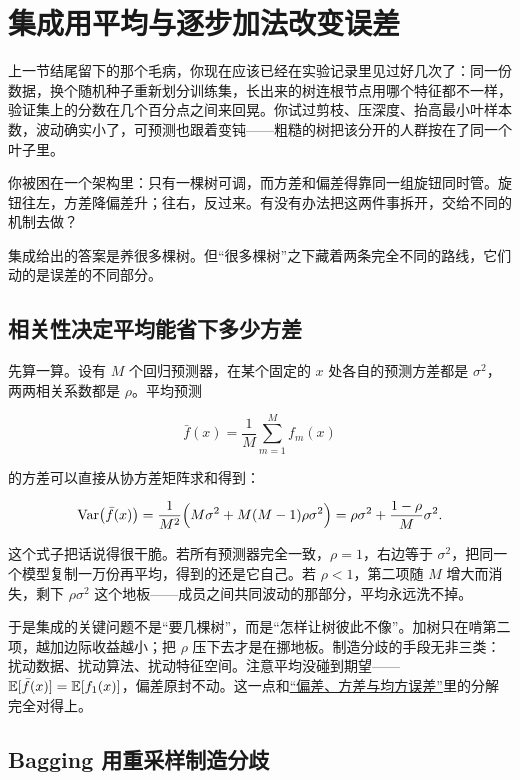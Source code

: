 \section{集成用平均与逐步加法改变误差}
\label{sec:13-Machine-Learning/03-Trees-Ensembles-and-Neighbors/02}

上一节结尾留下的那个毛病，你现在应该已经在实验记录里见过好几次了：同一份数据，换个随机种子重新划分训练集，长出来的树连根节点用哪个特征都不一样，验证集上的分数在几个百分点之间来回晃。你试过剪枝、压深度、抬高最小叶样本数，波动确实小了，可预测也跟着变钝——粗糙的树把该分开的人群按在了同一个叶子里。

你被困在一个架构里：只有一棵树可调，而方差和偏差得靠同一组旋钮同时管。旋钮往左，方差降偏差升；往右，反过来。有没有办法把这两件事拆开，交给不同的机制去做？

集成给出的答案是养很多棵树。但``很多棵树''之下藏着两条完全不同的路线，它们动的是误差的不同部分。

\subsection{相关性决定平均能省下多少方差}

先算一算。设有 \(M\) 个回归预测器，在某个固定的 \(x\) 处各自的预测方差都是 \(\sigma^2\)，两两相关系数都是 \(\rho\)。平均预测

\[
\bar f(x)=\frac1M\sum_{m=1}^{M}f_m(x)
\]

的方差可以直接从协方差矩阵求和得到：

\[
\operatorname{Var}\bigl(\bar f(x)\bigr)
=\frac{1}{M^2}\Bigl(M\sigma^2 + M(M-1)\rho\sigma^2\Bigr)
=\rho\sigma^2 + \frac{1-\rho}{M}\sigma^2 .
\]

这个式子把话说得很干脆。若所有预测器完全一致，\(\rho=1\)，右边等于 \(\sigma^2\)，把同一个模型复制一万份再平均，得到的还是它自己。若 \(\rho<1\)，第二项随 \(M\) 增大而消失，剩下 \(\rho\sigma^2\) 这个地板——成员之间共同波动的那部分，平均永远洗不掉。

于是集成的关键问题不是``要几棵树''，而是``怎样让树彼此不像''。加树只在啃第二项，越加边际收益越小；把 \(\rho\) 压下去才是在挪地板。制造分歧的手段无非三类：扰动数据、扰动算法、扰动特征空间。注意平均没碰到期望——\(\mathbb{E}[\bar f(x)]=\mathbb{E}[f_1(x)]\)，偏差原封不动。这一点和\hyperref[sec:11-Mathematical-Statistics/02-Point-Estimation/01]{``偏差、方差与均方误差''}里的分解完全对得上。

\subsection{Bagging 用重采样制造分歧}


